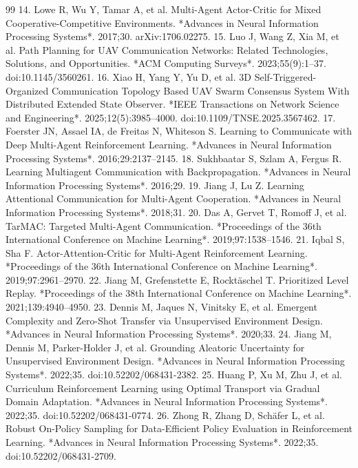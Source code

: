 \begin{thebibliography}{99}
 14. Lowe R, Wu Y, Tamar A, et al. Multi-Agent Actor-Critic for Mixed Cooperative-Competitive Environments. *Advances in Neural Information Processing Systems*. 2017;30. arXiv:1706.02275.
 15. Luo J, Wang Z, Xia M, et al. Path Planning for UAV Communication Networks: Related Technologies, Solutions, and Opportunities. *ACM Computing Surveys*. 2023;55(9):1--37. doi:10.1145/3560261.
 16. Xiao H, Yang Y, Yu D, et al. 3D Self-Triggered-Organized Communication Topology Based UAV Swarm Consensus System With Distributed Extended State Observer. *IEEE Transactions on Network Science and Engineering*. 2025;12(5):3985--4000. doi:10.1109/TNSE.2025.3567462.
 17. Foerster JN, Assael IA, de Freitas N, Whiteson S. Learning to Communicate with Deep Multi-Agent Reinforcement Learning. *Advances in Neural Information Processing Systems*. 2016;29:2137--2145.
 18. Sukhbaatar S, Szlam A, Fergus R. Learning Multiagent Communication with Backpropagation. *Advances in Neural Information Processing Systems*. 2016;29.
 19. Jiang J, Lu Z. Learning Attentional Communication for Multi-Agent Cooperation. *Advances in Neural Information Processing Systems*. 2018;31.
 20. Das A, Gervet T, Romoff J, et al. TarMAC: Targeted Multi-Agent Communication. *Proceedings of the 36th International Conference on Machine Learning*. 2019;97:1538--1546.
 21. Iqbal S, Sha F. Actor-Attention-Critic for Multi-Agent Reinforcement Learning. *Proceedings of the 36th International Conference on Machine Learning*. 2019;97:2961--2970.
 22. Jiang M, Grefenstette E, Rocktäschel T. Prioritized Level Replay. *Proceedings of the 38th International Conference on Machine Learning*. 2021;139:4940--4950.
 23. Dennis M, Jaques N, Vinitsky E, et al. Emergent Complexity and Zero-Shot Transfer via Unsupervised Environment Design. *Advances in Neural Information Processing Systems*. 2020;33.
 24. Jiang M, Dennis M, Parker-Holder J, et al. Grounding Aleatoric Uncertainty for Unsupervised Environment Design. *Advances in Neural Information Processing Systems*. 2022;35. doi:10.52202/068431-2382.
 25. Huang P, Xu M, Zhu J, et al. Curriculum Reinforcement Learning using Optimal Transport via Gradual Domain Adaptation. *Advances in Neural Information Processing Systems*. 2022;35. doi:10.52202/068431-0774.
 26. Zhong R, Zhang D, Schäfer L, et al. Robust On-Policy Sampling for Data-Efficient Policy Evaluation in Reinforcement Learning. *Advances in Neural Information Processing Systems*. 2022;35. doi:10.52202/068431-2709.

\end{thebibliography}
